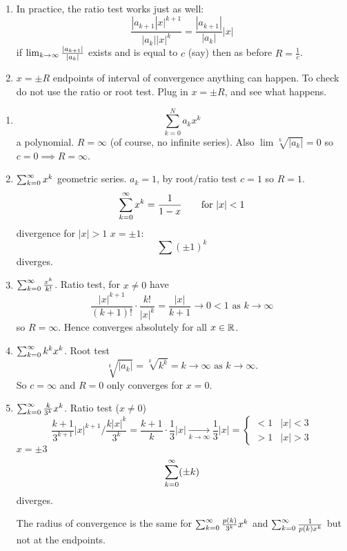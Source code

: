 \documentclass[10pt, a4paper]{article}
\newcommand{\limas}[3][n]{#2 \to #3 \text{ as } #1 \to \infty}
\begin{document}
\begin{remark}
    \begin{enumerate}[label = (\roman*)]
        \item In practice,
        the ratio test works just as well:
        \[
        \frac{|a_{k + 1}|x| ^ {k + 1}}{|a_k||x| ^ k} = \frac{|a_{k + 1}|}{|a_k|}|x|
        \]
        if $\liminfty[k]\frac{|a_{k + 1}|}{|a_k|}$ exists and is equal to $c$
        (say)
        then as before $R = \frac{1}{c}$.

        \item $x = \pm R$ endpoints of interval of convergence anything can happen.
        To check do not use the ratio or root test.
        Plug in $x = \pm R$,
        and see what happens.
    \end{enumerate}
\end{remark}

\begin{example}\phantom{}
    \begin{enumerate}[label = (\roman*)]
        \item
        \[
        \sum_{k = 0}^{N}a_kx ^ k
        \]
        a polynomial.
        $R = \infty$
        (of course,
        no infinite series).
        Also $\lim\sqrt[k]{|a_k|} = 0$ so $c = 0 \implies R = \infty$.

        \item $\infsumo x ^ k$ geometric series.
        $a_k = 1$,
        by root/ratio test $c = 1$ so $R = 1$.
        \[
        \infsumo x ^ k = \frac{1}{1 - x}\qquad\text{for } |x| < 1
        \]
        divergence for $|x| > 1$
        $x = \pm 1$:
        \[
        \sum(\pm 1) ^ k
        \]
        diverges.

        \item $\infsumo\frac{x ^ k}{k!}$.
        Ratio test,
        for $x \neq 0$ have
        \[
        \frac{|x| ^ {k + 1}}{(k + 1)!} \cdot \frac{k!}{|x| ^ k} = \limas[k]{\frac{|x|}{k + 1}}{0 < 1}
        \]
        so $R = \infty$.
        Hence converges absolutely for all $x \in \R$.

        \item $\infsumo k ^ kx ^ k$.
        Root test
        \[
        \sqrt[k]{|a_k|} = \sqrt[k]{k ^ k} = \limas[k]{k}{\infty}.
        \]
        So $c = \infty$ and $R = 0$ only converges for $x = 0$.

        \item $\infsumo\frac{k}{3 ^ k}x ^ k$.
        Ratio test
        ($x \neq 0$)
        \[
        \frac{k + 1}{3 ^ {k + 1}}|x| ^ {k + 1} / \frac{k|x| ^ k}{3 ^ k} = \frac{k + 1}{k}\cdot\frac{1}{3}|x| \xrightarrow[k \to \infty]{} \frac{1}{3}|x| = \begin{cases}
            < 1 & |x| < 3 \\
            > 1 & |x| > 3
        \end{cases}
        \]
        $x = \pm 3$
        \[
        \infsumo(\pm k)
        \]
        diverges.

        The radius of convergence is the same for $\infsumo\frac{p(k)}{3 ^ k}x ^ k$ and $\infsumo\frac{1}{p(k)x ^ k}$ but not at the endpoints.
    \end{enumerate}
\end{example}
\end{document}
